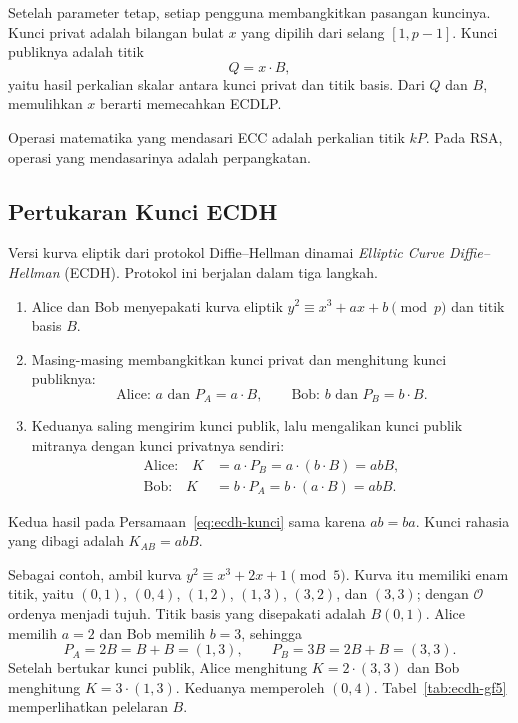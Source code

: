 Setelah parameter tetap, setiap pengguna membangkitkan pasangan kuncinya.
Kunci privat adalah bilangan bulat $x$ yang dipilih dari selang $[1, p-1]$.
Kunci publiknya adalah titik
\begin{equation}
Q = x \cdot B ,
\label{eq:ecc-kunci-publik}
\end{equation}
yaitu hasil perkalian skalar antara kunci privat dan titik basis. Dari $Q$ dan
$B$, memulihkan $x$ berarti memecahkan ECDLP.

Operasi matematika yang mendasari ECC adalah perkalian titik $kP$. Pada RSA,
operasi yang mendasarinya adalah perpangkatan.

\subsection{Pertukaran Kunci ECDH}
\label{subsec:ecdh}

Versi kurva eliptik dari protokol Diffie--Hellman dinamai \textit{Elliptic
Curve Diffie--Hellman} (ECDH). Protokol ini berjalan dalam tiga langkah.

\begin{enumerate}
    \item Alice dan Bob menyepakati kurva eliptik
          $y^2 \equiv x^3 + ax + b \pmod{p}$ dan titik basis $B$.
    \item Masing-masing membangkitkan kunci privat dan menghitung kunci
          publiknya:
          \[
          \text{Alice: } a \text{ dan } P_A = a \cdot B, \qquad
          \text{Bob: } b \text{ dan } P_B = b \cdot B .
          \]
    \item Keduanya saling mengirim kunci publik, lalu mengalikan kunci publik
          mitranya dengan kunci privatnya sendiri:
          \begin{equation}
          \begin{aligned}
          \text{Alice:}\quad K &= a \cdot P_B = a \cdot (b \cdot B) = abB, \\
          \text{Bob:}\quad   K &= b \cdot P_A = b \cdot (a \cdot B) = abB .
          \end{aligned}
          \label{eq:ecdh-kunci}
          \end{equation}
\end{enumerate}

Kedua hasil pada Persamaan~\eqref{eq:ecdh-kunci} sama karena $ab = ba$.
Kunci rahasia yang dibagi adalah $K_{AB} = abB$.

Sebagai contoh, ambil kurva $y^2 \equiv x^3 + 2x + 1 \pmod{5}$. Kurva itu
memiliki enam titik, yaitu $(0,1)$, $(0,4)$, $(1,2)$, $(1,3)$, $(3,2)$, dan
$(3,3)$; dengan $\mathcal{O}$ ordenya menjadi tujuh. Titik basis yang
disepakati adalah $B(0, 1)$. Alice memilih $a = 2$ dan Bob memilih $b = 3$,
sehingga
\[
P_A = 2B = B + B = (1, 3), \qquad
P_B = 3B = 2B + B = (3, 3) .
\]
Setelah bertukar kunci publik, Alice menghitung $K = 2 \cdot (3, 3)$ dan Bob
menghitung $K = 3 \cdot (1, 3)$. Keduanya memperoleh $(0, 4)$.
Tabel~\ref{tab:ecdh-gf5} memperlihatkan pelelaran $B$.

